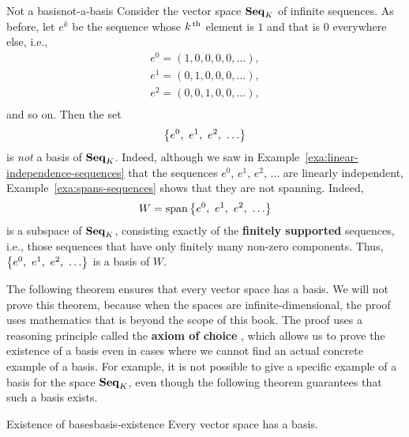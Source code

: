 \begin{example}{Not a basis}{not-a-basis}
  Consider the vector space $\mathbf{Seq}_K$ of infinite sequences. As before,
  let $e^k$ be the sequence whose $k^{\,\rm th}$ element is $1$ and that is
  $0$ everywhere else, i.e.,
    \begin{equation*}
    \begin{array}{l}
      e^0 = (1,0,0,0,0,\ldots), \\
      e^1 = (0,1,0,0,0,\ldots), \\
      e^2 = (0,0,1,0,0,\ldots), \\
    \end{array}
  \end{equation*}
  and so on. Then the set
  \begin{equation*}
    \left\{e^0,~ e^1,~ e^2,~ \ldots\right\}
  \end{equation*}
  is \textit{not} a basis of $\mathbf{Seq}_K$. Indeed, although we saw in
  Example~\ref{exa:linear-independence-sequences} that the sequences
  $e^0$, $e^1$, $e^2$, $\ldots$ are linearly independent,
  Example~\ref{exa:spans-sequences} shows that they are not spanning.
  Indeed,
  \begin{equation*}
    W = \sspan\set{e^0,~ e^1,~ e^2,~ \ldots}
  \end{equation*}
  is a subspace of $\mathbf{Seq}_K$, consisting exactly of the
  \textbf{finitely supported}%
   sequences, i.e., those sequences
  that have only finitely many non-zero components. Thus, $\left\{e^0,~ e^1,~
    e^2,~ \ldots\right\}$ is a basis of $W$.
\end{example}

The following theorem ensures that every vector space has a basis.  We
will not prove this theorem, because when the spaces are
infinite-dimensional, the proof uses mathematics that is beyond the
scope of this book. The proof uses a reasoning principle called the
\textbf{axiom of choice}%
%
, which allows us to prove the existence of a
basis even in cases where we cannot find an actual concrete example of
a basis.  For example, it is not possible to give a specific example
of a basis for the space $\mathbf{Seq}_K$, even though the following theorem
guarantees that such a basis exists.

\begin{theorem}{Existence of bases}{basis-existence}
  Every vector space has a basis.
\end{theorem}


